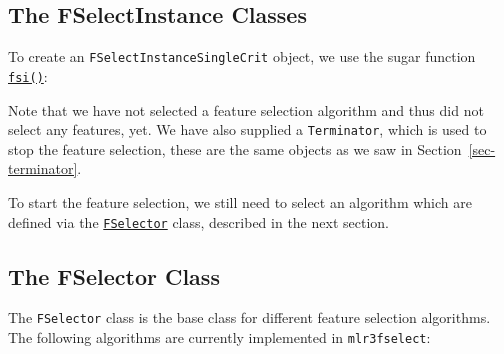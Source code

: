 \hypertarget{the-fselectinstance-classes}{%
\subsection{The FSelectInstance Classes}\label{the-fselectinstance-classes}}

To create an \texttt{FSelectInstanceSingleCrit} object, we use the sugar
function
\href{https://mlr3fselect.mlr-org.com/reference/fsi.html}{\texttt{fsi()}}:

\begin{Shaded}
\begin{Highlighting}[]
\OtherTok{=} \NormalTok{(}
   \NormalTok{(}\NormalTok{, } \NormalTok{),}
   \NormalTok{(}\NormalTok{),}
   \NormalTok{(}\NormalTok{, } \NormalTok{)}
\NormalTok{)}
\end{Highlighting}
\end{Shaded}

Note that we have not selected a feature selection algorithm and thus
did not select any features, yet. We have also supplied a
\texttt{Terminator}, which is used to stop the feature selection, these
are the same objects as we saw in Section~\ref{sec-terminator}.

To start the feature selection, we still need to select an algorithm
which are defined via the
\href{https://mlr3fselect.mlr-org.com/reference/FSelector.html}{\texttt{FSelector}}
class, described in the next section.

\hypertarget{the-fselector-class}{%
\subsection{The FSelector Class}\label{the-fselector-class}}

The \texttt{FSelector} class is the base class
for different feature selection algorithms. The following algorithms are
currently implemented in \texttt{mlr3fselect}:


